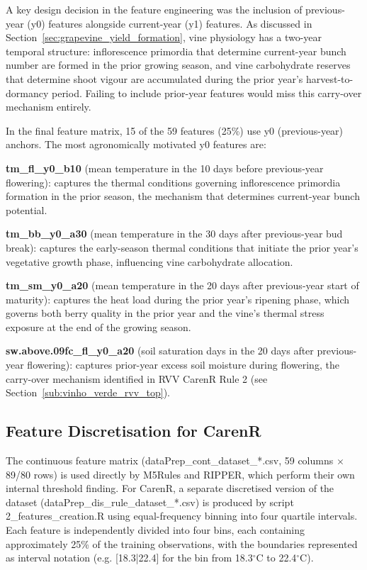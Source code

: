 A key design decision in the feature engineering was the inclusion of previous-year (y0) features alongside current-year (y1) features. As discussed in Section~\ref{sec:grapevine_yield_formation}, vine physiology has a two-year temporal structure: inflorescence primordia that determine current-year bunch number are formed in the prior growing season, and vine carbohydrate reserves that determine shoot vigour are accumulated during the prior year's harvest-to-dormancy period. Failing to include prior-year features would miss this carry-over mechanism entirely.

In the final feature matrix, 15 of the 59 features (25\%) use y0 (previous-year) anchors. The most agronomically motivated y0 features are:

\textbf{tm\_fl\_y0\_b10 }(mean temperature in the 10 days before previous-year flowering): captures the thermal conditions governing inflorescence primordia formation in the prior season, the mechanism that determines current-year bunch potential.

\textbf{tm\_bb\_y0\_a30 }(mean temperature in the 30 days after previous-year bud break): captures the early-season thermal conditions that initiate the prior year's vegetative growth phase, influencing vine carbohydrate allocation.

\textbf{tm\_sm\_y0\_a20 }(mean temperature in the 20 days after previous-year start of maturity): captures the heat load during the prior year's ripening phase, which governs both berry quality in the prior year and the vine's thermal stress exposure at the end of the growing season.

\textbf{sw.above.09fc\_fl\_y0\_a20 }(soil saturation days in the 20 days after previous-year flowering): captures prior-year excess soil moisture during flowering, the carry-over mechanism identified in RVV CarenR Rule 2 (see Section~\ref{sub:vinho_verde_rvv_top}).


\subsection{Feature Discretisation for CarenR}\label{sub:feature_discretisation_for_carenr}

The continuous feature matrix (dataPrep\_cont\_dataset\_*.csv, 59 columns $\times$ 89/80 rows) is used directly by M5Rules and RIPPER, which perform their own internal threshold finding. For CarenR, a separate discretised version of the dataset (dataPrep\_dis\_rule\_dataset\_*.csv) is produced by script 2\_features\_creation.R using equal-frequency binning into four quartile intervals. Each feature is independently divided into four bins, each containing approximately 25\% of the training observations, with the boundaries represented as interval notation (e.g. [18.3|22.4] for the bin from 18.3$^\circ$C to 22.4$^\circ$C).

